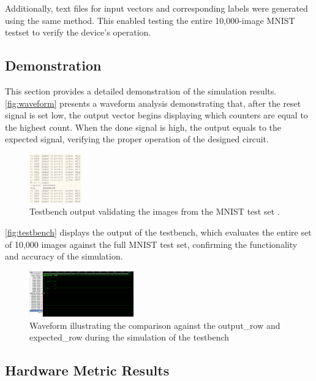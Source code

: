 \documentclass[conference]{IEEEtran}
\begin{document}
Additionally, text files for input vectors and corresponding labels were generated using the same method. This enabled testing the entire 10,000-image MNIST \cite{mnist} testset to verify the device's operation.




\subsection{Demonstration}
This section provides a detailed demonstration of the simulation results. 
\autoref{fig:waveform} presents a waveform analysis demonstrating that, after the reset signal is set low, the output vector begins displaying which counters are equal to the highest count. When the done signal is high, the output equals to the expected signal, verifying the proper operation of the designed circuit.

\begin{figure}[h]
    \centering
    \includegraphics[width=0.2\textwidth]{./testbench.png}
    \caption{Testbench output validating the images from the MNIST test set \cite{mnist}.}
    \label{fig:testbench}
\end{figure}

\autoref{fig:testbench} displays the output of the testbench, which evaluates the entire set of 10,000 images against the full MNIST test set, confirming the functionality and accuracy of the simulation.

\begin{figure}[h]
    \centering
    \includegraphics[width=0.4\textwidth]{./Waveform_picture.png}
    \caption{Waveform illustrating the comparison against the output\_row and expected\_row during the simulation of the testbench}
    \label{fig:waveform}
\end{figure}





\subsection{Hardware Metric Results}
\label{ref:hardware_metrics}
\end{document}
